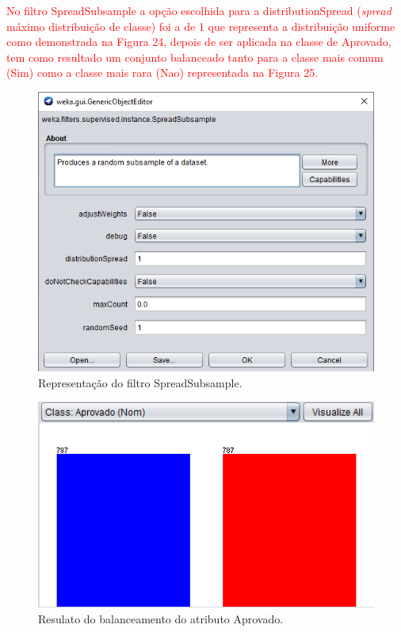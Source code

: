 \par
\textcolor{red}{No filtro SpreadSubsample a opção escolhida para a distributionSpread (\textit{spread} máximo distribuição de classe) foi a de 1 que representa a distribuição uniforme como demonstrada na Figura 24, depois de ser aplicada na classe de Aprovado, tem como resultado um conjunto balanceado tanto para a classe mais comum (Sim) como a classe mais rara (Nao) representada na Figura 25.}

\par
\begin{figure}[!htp]
	\begin{center}
    \caption{\label{fig:waveform_fig} Representação do filtro SpreadSubsample.}
	\includegraphics[scale=0.99]{Figuras/SpreadSubsample.png}
	\end{center}
\end{figure}

\par
\begin{figure}[!htp]
	\begin{center}
    \caption{\label{fig:waveform_fig} Resulato do balanceamento do atributo Aprovado.}
	\includegraphics[scale=0.90]{Figuras/Atributo_aprovado_balanceado.png}
	\end{center}
\end{figure}

\par
